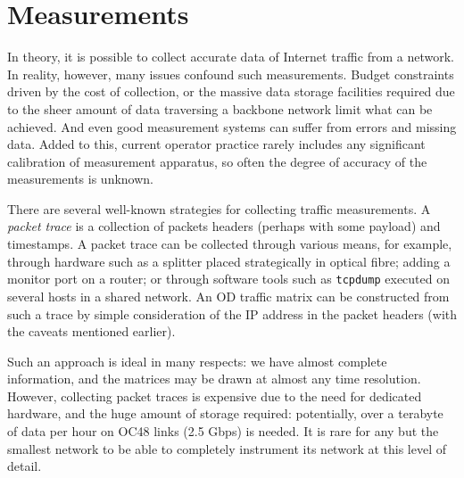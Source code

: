\section{Measurements}
\label{sec:measurements}

In theory, it is possible to collect accurate data of Internet traffic
from a network. In reality, however, many issues confound such
measurements. Budget constraints driven by the cost of collection, or
the massive data storage facilities required due to the sheer amount
of data traversing a backbone network limit what can be achieved. And
even good measurement systems can suffer from errors and missing
data. Added to this, current operator practice rarely includes any
significant calibration of measurement apparatus, so often the degree
of accuracy of the measurements is unknown.

There are several well-known strategies for collecting traffic
measurements. A {\em packet trace} is a collection of packets headers
(perhaps with some payload) and timestamps.  A packet trace can be
collected through various means, for example, through hardware such as
a splitter placed strategically in optical fibre; adding a monitor
port on a router; or through software tools such as \texttt{tcpdump}
executed on several hosts in a shared network. An OD traffic matrix
can be constructed from such a trace by simple consideration of the IP
address in the packet headers (with the caveats mentioned earlier).

Such an approach is ideal in many respects: we have almost complete
information, and the matrices may be drawn at almost any time
resolution. However, collecting packet traces is expensive due to the
need for dedicated hardware, and the huge amount of storage required:
potentially, over a terabyte of data per hour on OC48 links (2.5 Gbps)
is needed. It is rare for any but the smallest network to be able to
completely instrument its network at this level of detail.

